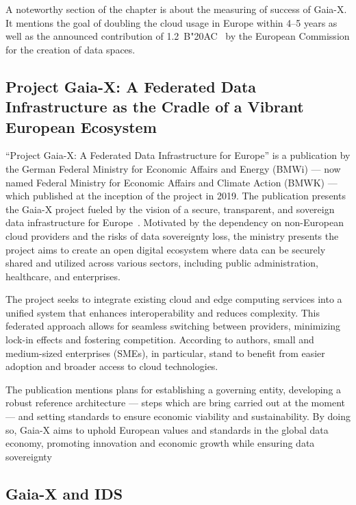 A noteworthy section of the chapter is about the measuring of success of Gaia-X.
It mentions the goal of doubling the cloud usage in Europe within 4--5 years as well as the announced contribution of 1.2~B\char"20AC~ by the European Commission for the creation of data spaces. %

\subsection{Project Gaia-X: A Federated Data Infrastructure as the Cradle of a Vibrant European Ecosystem}\label{subsec:project-gaia-x:-a-federated-data-infrastructure-as-the-cradle-of-a-vibrant-european-ecosystem}

``Project Gaia-X: A Federated Data Infrastructure for Europe'' is a publication by the German Federal Ministry for Economic Affairs and Energy (BMWi) --- now named Federal Ministry for Economic Affairs and Climate Action (BMWK) --- which published at the inception of the project in 2019.
The publication presents the Gaia-X project fueled by the vision of a secure, transparent, and sovereign data infrastructure for Europe~\cite{project_gaia_x}.
Motivated by the dependency on non-European cloud providers and the risks of data sovereignty loss, the ministry presents the project aims to create an open digital ecosystem where data can be securely shared and utilized across various sectors, including public administration, healthcare, and enterprises.

The project seeks to integrate existing cloud and edge computing services into a unified system that enhances interoperability and reduces complexity.
This federated approach allows for seamless switching between providers, minimizing lock-in effects and fostering competition.
According to authors, small and medium-sized enterprises (SMEs), in particular, stand to benefit from easier adoption and broader access to cloud technologies.

The publication mentions plans for establishing a governing entity, developing a robust reference architecture --- steps which are bring carried out at the moment --- and setting standards to ensure economic viability and sustainability.
By doing so, Gaia-X aims to uphold European values and standards in the global data economy, promoting innovation and economic growth while ensuring data sovereignty

\subsection{Gaia-X and IDS}\label{subsec:gaia-x-and-ids}

